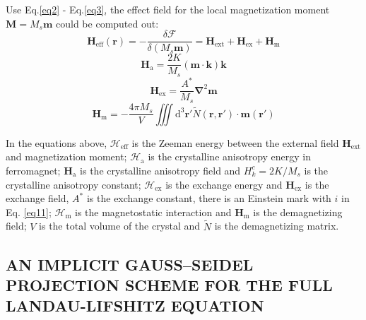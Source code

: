 \documentclass{article}
\begin{document}
Use Eq.\eqref{eq2} - Eq.\eqref{eq3}, the effect field for the local magnetization moment $\bm{M}=M_s\bm{m}$ could be computed out:
\begin{equation}
\bm{H}_\text{eff}\left(\bm{r}\right)=-\frac{\delta \mathcal{F}}{\delta \left(M_s\bm{m}\right)}=\bm{H}_\text{ext}+\bm{H}_\text{ex}+\bm{H}_\text{m}\label{eq13}
\end{equation}
\begin{equation}
\bm{H}_\text{a}=\frac{2K}{M_s}\left(\bm{m}\cdot \bm{k}\right)\bm{k}\label{eq14}
\end{equation}
\begin{equation}
\bm{H}_\text{ex}=\frac{A^*}{M_s}\bm{\nabla}^2\bm{m}\label{eq15}
\end{equation}
\begin{equation}
\bm{H}_\text{m}=-\frac{4\pi M_s}{V}\iiint \mathrm{d}^3\bm{r}'\tilde{N}\left(\bm{r},\bm{r}'\right)\cdot \bm{m}\left(\bm{r}'\right)\label{eq16}
\end{equation}

In the equations above, $\mathcal{H}_\text{eff}$ is the Zeeman energy between the external field $\bm{H}_\text{ext}$ and magnetization moment; $\mathcal{H}_\text{a}$ is the crystalline anisotropy energy in ferromagnet; $\bm{H}_\text{a}$ is the crystalline anisotropy field and $H_k^c=2K/M_s$ is the crystalline anisotropy constant; $\mathcal{H}_\text{ex}$ is the exchange energy and $\bm{H}_\text{ex}$ is the exchange field, $A^*$ is the exchange constant, there is an Einstein mark with $i$ in Eq. \eqref{eq11}; $\mathcal{H}_\text{m}$ is the magnetostatic interaction and $\bm{H}_\text{m}$ is the demagnetizing field; $V$ is the total volume of the crystal and $\tilde{N}$ is the demagnetizing matrix.
\subsection{AN IMPLICIT GAUSS–SEIDEL PROJECTION SCHEME FOR THE FULL LANDAU-LIFSHITZ EQUATION}
\end{document}
